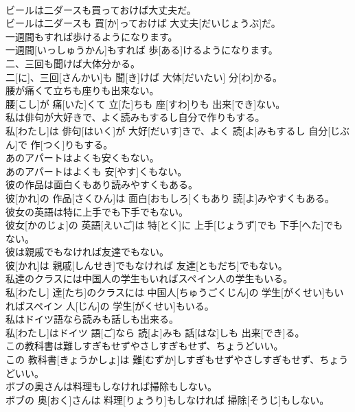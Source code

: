 \documentclass[8pt]{extreport}
\begin{document}
\begin{CJK}{UTF8}{min}
\\	ビールは二ダースも買っておけば大丈夫だ。	
\\	ビールは二ダースも 買[か]っておけば 大丈夫[だいじょうぶ]だ。
\\	一週間もすれば歩けるようになります。	
\\	一週間[いっしゅうかん]もすれば 歩[ある]けるようになります。
\\	二、三回も聞けば大体分かる。	
\\	二[に]、三回[さんかい]も 聞[き]けば 大体[だいたい] 分[わ]かる。
\\	腰が痛くて立ちも座りも出来ない。	
\\	腰[こし]が 痛[いた]くて 立[た]ちも 座[すわ]りも 出来[でき]ない。
\\	私は俳句が大好きで、よく読みもするし自分で作りもする。	
\\	私[わたし]は 俳句[はいく]が 大好[だいす]きで、よく 読[よ]みもするし 自分[じぶん]で 作[つく]りもする。
\\	あのアパートはよくも安くもない。	
\\	あのアパートはよくも 安[やす]くもない。
\\	彼の作品は面白くもあり読みやすくもある。	
\\	彼[かれ]の 作品[さくひん]は 面白[おもしろ]くもあり 読[よ]みやすくもある。
\\	彼女の英語は特に上手でも下手でもない。	
\\	彼女[かのじょ]の 英語[えいご]は 特[とく]に 上手[じょうず]でも 下手[へた]でもない。
\\	彼は親戚でもなければ友達でもない。	
\\	彼[かれ]は 親戚[しんせき]でもなければ 友達[ともだち]でもない。
\\	私達のクラスには中国人の学生もいればスペイン人の学生もいる。	
\\	私[わたし] 達[たち]のクラスには 中国人[ちゅうごくじん]の 学生[がくせい]もいればスペイン 人[じん]の 学生[がくせい]もいる。
\\	私はドイツ語なら読みも話しも出来る。	
\\	私[わたし]はドイツ 語[ご]なら 読[よ]みも 話[はな]しも 出来[でき]る。
\\	この教科書は難しすぎもせずやさしすぎもせず、ちょうどいい。	
\\	この 教科書[きょうかしょ]は 難[むずか]しすぎもせずやさしすぎもせず、ちょうどいい。
\\	ボブの奥さんは料理もしなければ掃除もしない。	
\\	ボブの 奥[おく]さんは 料理[りょうり]もしなければ 掃除[そうじ]もしない。

\end{CJK}
\end{document}
